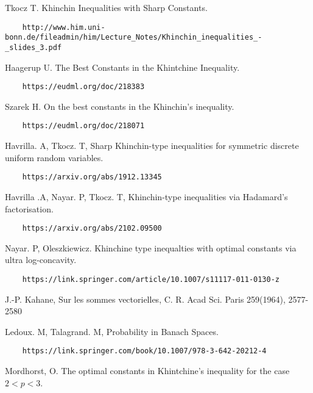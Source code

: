 \documentclass[10pt]{article}
\newcommand{\1}{\textbf{1}}
\theoremstyle{remark}
\theoremstyle{definition}
\begin{document}
\begin{thebibliography}{9}

 Tkocz T. Khinchin Inequalities with Sharp Constants. 

\begin{verbatim}
	http://www.him.uni-bonn.de/fileadmin/him/Lecture_Notes/Khinchin_inequalities_-_slides_3.pdf
\end{verbatim}

 Haagerup U. The Best Constants in the Khintchine Inequality. 

\begin{verbatim}
	https://eudml.org/doc/218383
\end{verbatim}

 Szarek H. On the best constants in the Khinchin's inequality. 

\begin{verbatim}
	https://eudml.org/doc/218071
\end{verbatim}

 Havrilla. A, Tkocz. T, Sharp Khinchin-type inequalities for symmetric discrete uniform random variables. 

\begin{verbatim}
	https://arxiv.org/abs/1912.13345
\end{verbatim}

 Havrilla .A, Nayar. P, Tkocz. T, Khinchin-type inequalities via Hadamard's factorisation. 

\begin{verbatim}
	https://arxiv.org/abs/2102.09500
\end{verbatim}

 Nayar. P, Oleszkiewicz. Khinchine type inequalties with optimal constants via ultra log-concavity. 

\begin{verbatim}
	https://link.springer.com/article/10.1007/s11117-011-0130-z
\end{verbatim}

 J.-P. Kahane, Sur les sommes vectorielles, C. R. Acad Sci. Paris 259(1964), 2577-2580

 Ledoux. M, Talagrand. M, Probability in Banach Spaces. 

\begin{verbatim}
	https://link.springer.com/book/10.1007/978-3-642-20212-4
\end{verbatim}

 Mordhorst, O. The optimal constants in Khintchine's inequality for the case $2 < p < 3$. 


\end{thebibliography}
\end{document}
